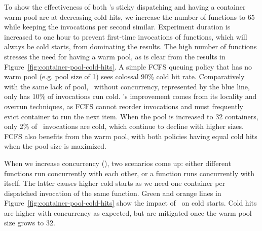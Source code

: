 To show the effectiveness of both \QName's sticky dispatching and having a container warm pool are at decreasing cold hits, we increase the number of functions to 65 while keeping the invocations per second similar.
Experiment duration is increased to one hour to prevent first-time invocations of functions, which will always be cold starts, from dominating the results.
The high number of functions stresses the need for having a warm pool, as is clear from the results in Figure~\ref{fig:container-pool-cold-hits}.
A simple FCFS queuing policy that has no warm pool (e.g. pool size of 1) sees colossal 90\% cold hit rate.
Comparatively with the same lack of pool, \QName~without concurrency, represented by the blue line, only has 10\% of invocations run cold.
\QName's improvement comes from its locality and overrun techniques, as FCFS cannot reorder invocations and must frequently evict container to run the next item.
When the pool is increased to 32 containers, only 2\% of \QName~invocations are cold, which continue to decline with higher sizes.
FCFS also benefits from the warm pool, with both policies having equal cold hits when the pool size is maximized.

When we increase concurrency (\D), two scenarios come up: either different functions run concurrently with each other, or a function runs concurrently with itself.
The latter causes higher cold starts as we need one container per dispatched invocation of the same function.
Green and orange lines in Figure~\ref{fig:container-pool-cold-hits} show the impact of \D~on cold starts.
Cold hits are higher with concurrency as expected, but are mitigated once the warm pool size grows to 32.

